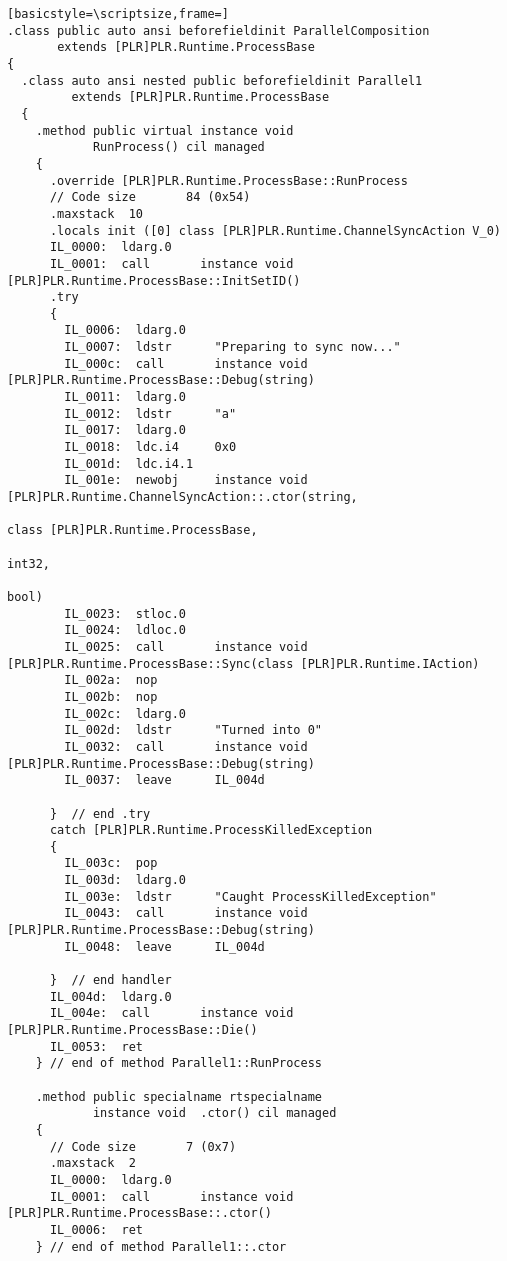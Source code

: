 \begin{lstlisting}[basicstyle=\scriptsize,frame=]
.class public auto ansi beforefieldinit ParallelComposition
       extends [PLR]PLR.Runtime.ProcessBase
{
  .class auto ansi nested public beforefieldinit Parallel1
         extends [PLR]PLR.Runtime.ProcessBase
  {
    .method public virtual instance void 
            RunProcess() cil managed
    {
      .override [PLR]PLR.Runtime.ProcessBase::RunProcess
      // Code size       84 (0x54)
      .maxstack  10
      .locals init ([0] class [PLR]PLR.Runtime.ChannelSyncAction V_0)
      IL_0000:  ldarg.0
      IL_0001:  call       instance void [PLR]PLR.Runtime.ProcessBase::InitSetID()
      .try
      {
        IL_0006:  ldarg.0
        IL_0007:  ldstr      "Preparing to sync now..."
        IL_000c:  call       instance void [PLR]PLR.Runtime.ProcessBase::Debug(string)
        IL_0011:  ldarg.0
        IL_0012:  ldstr      "a"
        IL_0017:  ldarg.0
        IL_0018:  ldc.i4     0x0
        IL_001d:  ldc.i4.1
        IL_001e:  newobj     instance void [PLR]PLR.Runtime.ChannelSyncAction::.ctor(string,
                                                                                     class [PLR]PLR.Runtime.ProcessBase,
                                                                                     int32,
                                                                                     bool)
        IL_0023:  stloc.0
        IL_0024:  ldloc.0
        IL_0025:  call       instance void [PLR]PLR.Runtime.ProcessBase::Sync(class [PLR]PLR.Runtime.IAction)
        IL_002a:  nop
        IL_002b:  nop
        IL_002c:  ldarg.0
        IL_002d:  ldstr      "Turned into 0"
        IL_0032:  call       instance void [PLR]PLR.Runtime.ProcessBase::Debug(string)
        IL_0037:  leave      IL_004d

      }  // end .try
      catch [PLR]PLR.Runtime.ProcessKilledException 
      {
        IL_003c:  pop
        IL_003d:  ldarg.0
        IL_003e:  ldstr      "Caught ProcessKilledException"
        IL_0043:  call       instance void [PLR]PLR.Runtime.ProcessBase::Debug(string)
        IL_0048:  leave      IL_004d

      }  // end handler
      IL_004d:  ldarg.0
      IL_004e:  call       instance void [PLR]PLR.Runtime.ProcessBase::Die()
      IL_0053:  ret
    } // end of method Parallel1::RunProcess

    .method public specialname rtspecialname 
            instance void  .ctor() cil managed
    {
      // Code size       7 (0x7)
      .maxstack  2
      IL_0000:  ldarg.0
      IL_0001:  call       instance void [PLR]PLR.Runtime.ProcessBase::.ctor()
      IL_0006:  ret
    } // end of method Parallel1::.ctor


\end{lstlisting}
